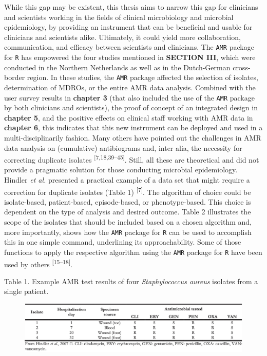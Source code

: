 \documentclass[
]{book}
\begin{document}
While this gap may be existent, this thesis aims to narrow this gap for clinicians and scientists working in the fields of clinical microbiology and microbial epidemiology, by providing an instrument that can be beneficial and usable for clinicians and scientists alike. Ultimately, it could yield more collaboration, communication, and efficacy between scientists and clinicians. The \texttt{AMR} package for \texttt{R} has empowered the four studies mentioned in \textbf{SECTION III}, which were conducted in the Northern Netherlands as well as in the Dutch-German cross-border region. In these studies, the \texttt{AMR} package affected the selection of isolates, determination of MDROs, or the entire AMR data analysis. Combined with the user survey results in \textbf{chapter 3} (that also included the use of the \texttt{AMR} package by both clinicians and scientists), the proof of concept of an integrated design in \textbf{chapter 5}, and the positive effects on clinical staff working with AMR data in \textbf{chapter 6}, this indicates that this new instrument can be deployed and used in a multi-disciplinarily fashion. Many others have pointed out the challenges in AMR data analysis on (cumulative) antibiograms and, inter alia, the necessity for correcting duplicate isolates \textsuperscript{{[}7,18,39--45{]}}. Still, all these are theoretical and did not provide a pragmatic solution for those conducting microbial epidemiology. Hindler \emph{et al.} presented a practical example of a data set that might require a correction for duplicate isolates (Table 1) \textsuperscript{{[}7{]}}. The algorithm of choice could be isolate-based, patient-based, episode-based, or phenotype-based. This choice is dependent on the type of analysis and desired outcome. Table 2 illustrates the scope of the isolates that should be included based on a chosen algorithm and, more importantly, shows how the \texttt{AMR} package for \texttt{R} can be used to accomplish this in one simple command, underlining its approachability. Some of those functions to apply the respective algorithm using the \texttt{AMR} package for \texttt{R} have been used by others \textsuperscript{{[}15--18{]}}.

Table 1. Example AMR test results of four \emph{Staphylococcus aureus} isolates from a single patient.

\begin{figure}

{\centering \includegraphics[width=1\linewidth]{images/11-t01} 

}

\end{figure}
\end{document}
